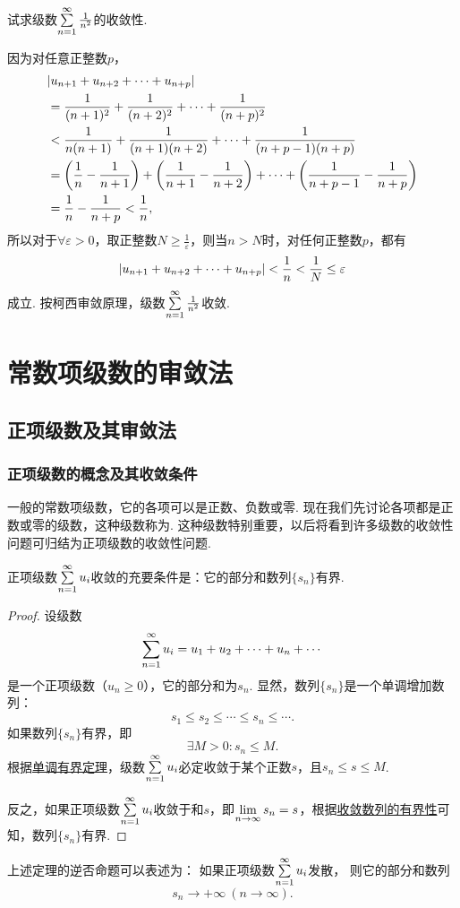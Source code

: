 \begin{example}
试求级数\(\sum\limits_{n=1}^\infty \frac{1}{n^2}\)的收敛性.
\begin{solution}
因为对任意正整数\(p\)，\begin{align*}
&\abs{u_{n+1}+u_{n+2}+\dotsb+u_{n+p}} \\
&=\frac{1}{(n+1)^2}+\frac{1}{(n+2)^2}+\dotsb+\frac{1}{(n+p)^2} \\
&<\frac{1}{n(n+1)}+\frac{1}{(n+1)(n+2)}+\dotsb+\frac{1}{(n+p-1)(n+p)} \\
&=\left(\frac{1}{n}-\frac{1}{n+1}\right)+\left(\frac{1}{n+1}-\frac{1}{n+2}\right)+\dotsb+\left(\frac{1}{n+p-1}-\frac{1}{n+p}\right) \\
&=\frac{1}{n}-\frac{1}{n+p} < \frac{1}{n},
\end{align*}
所以对于\(\forall \varepsilon > 0\)，取正整数\(N \geq \frac{1}{\varepsilon}\)，则当\(n > N\)时，对任何正整数\(p\)，都有\[
\abs{u_{n+1}+u_{n+2}+\dotsb+u_{n+p}}
< \frac{1}{n}
< \frac{1}{N}
\leq \varepsilon
\]成立.
按柯西审敛原理，级数\(\sum\limits_{n=1}^\infty \frac{1}{n^2}\)收敛.
\end{solution}
\end{example}

\section{常数项级数的审敛法}
\subsection{正项级数及其审敛法}
\subsubsection{正项级数的概念及其收敛条件}
一般的常数项级数，它的各项可以是正数、负数或零.
现在我们先讨论各项都是正数或零的级数，这种级数称为.
这种级数特别重要，以后将看到许多级数的收敛性问题可归结为正项级数的收敛性问题.

\begin{theorem}\label{theorem:无穷级数.正项级数收敛的充要条件}
正项级数\(\sum\limits_{n=1}^\infty u_i\)收敛的充要条件是：它的部分和数列\(\{s_n\}\)有界.
\begin{proof}
设级数\[
\sum\limits_{n=1}^\infty u_i = u_1 + u_2 + \dotsb + u_n + \dotsb
\]是一个正项级数（\(u_n \geq 0\)），它的部分和为\(s_n\).
显然，数列\(\{s_n\}\)是一个单调增加数列：\[
s_1 \leq s_2 \leq \dotsb \leq s_n \leq \dotsb.
\]如果数列\(\{s_n\}\)有界，即\[
\exists M>0 : s_n \leq M.
\]根据\hyperref[theorem:极限.数列的单调有界定理]{单调有界定理}，级数\(\sum\limits_{n=1}^\infty u_i\)必定收敛于某个正数\(s\)，且\(s_n \leq s \leq M\).

反之，如果正项级数\(\sum\limits_{n=1}^\infty u_i\)收敛于和\(s\)，即\(\lim\limits_{n\to\infty} s_n = s\)，根据\hyperref[theorem:极限.收敛数列的有界性]{收敛数列的有界性}可知，数列\(\{s_n\}\)有界.
\end{proof}
\end{theorem}
上述定理的逆否命题可以表述为：
如果正项级数\(\sum\limits_{n=1}^\infty u_i\)发散，
则它的部分和数列
\[
s_n \to +\infty\ (n\to\infty).
\]

